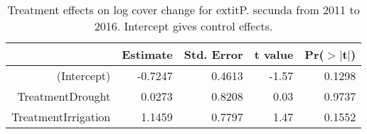 \begin{table}[ht]
\centering
\caption{Treatment effects on log cover change for 	extit{P. secunda} from 2011 to 2016. Intercept gives control effects.} 
\label{table:changePOSE}
\begin{tabular}{rrrrr}
  \hline
 & Estimate & Std. Error & t value & Pr($>$$|$t$|$) \\ 
  \hline
(Intercept) & -0.7247 & 0.4613 & -1.57 & 0.1298 \\ 
  TreatmentDrought & 0.0273 & 0.8208 & 0.03 & 0.9737 \\ 
  TreatmentIrrigation & 1.1459 & 0.7797 & 1.47 & 0.1552 \\ 
   \hline
\end{tabular}
\end{table}
